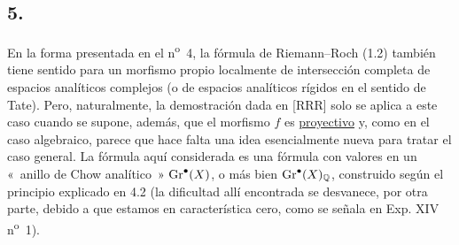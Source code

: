 
\subsection*{5.}
En la forma presentada en el n\textsuperscript{o}~4, la fórmula de
Riemann--Roch (1.2) también tiene sentido para un morfismo propio localmente
de intersección completa de espacios analíticos complejos (o de espacios
analíticos rígidos en el sentido de Tate). Pero, naturalmente, la
demostración dada en [RRR] solo se aplica a este caso cuando se supone,
además, que el morfismo $f$ es \underline{proyectivo} y, como en el caso
algebraico, parece que hace falta una idea esencialmente nueva para tratar el
caso general. La fórmula aquí considerada es una fórmula con valores en un
«~anillo de Chow analítico~» $\operatorname{Gr}^\bullet(X)$, o más bien
$\operatorname{Gr}^\bullet(X)_{\mathbb Q}$, construido según el principio explicado en
4.2 (la dificultad allí encontrada se desvanece, por otra parte, debido a
que estamos en característica cero, como se señala en Exp. XIV
n\textsuperscript{o}~1).

